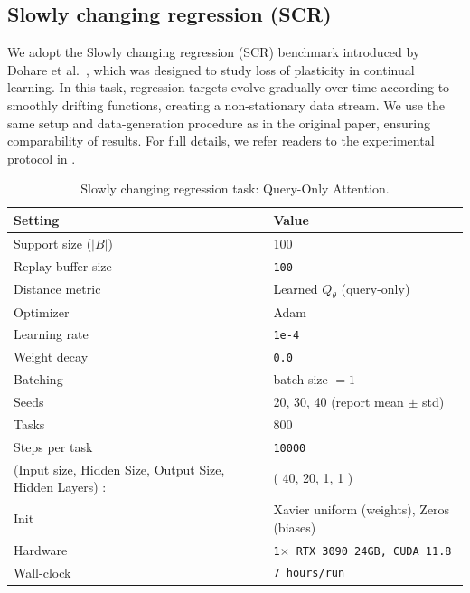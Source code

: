 \documentclass{article}
\begin{document}
\clearpage

\subsection{Slowly changing regression (SCR)}
\label{sec:scr_setup}
We adopt the Slowly changing regression (SCR) benchmark introduced by Dohare et al.~\citep{dohare2024loss}, 
which was designed to study loss of plasticity in continual learning.  
In this task, regression targets evolve gradually over time according to smoothly drifting functions, 
creating a non-stationary data stream.  
We use the same setup and data-generation procedure as in the original paper, ensuring comparability of results.  
For full details, we refer readers to the experimental protocol in \citep{dohare2024loss}.


 
\begin{table}[H]
\centering
\footnotesize
\caption{Slowly changing regression task: Query-Only Attention.}
\label{tab:scr_query_only_attention}
\begin{tabular}{@{}ll@{}}
\toprule
Setting & Value \\ \midrule
Support size ($|B|$) & 100 \\
Replay buffer size & \texttt{100} \\
Distance metric & Learned $Q_{\theta}$ (query-only) \\
Optimizer & Adam \\
Learning rate & \texttt{1e-4} \\
Weight decay & \texttt{0.0} \\
Batching &  batch size $=1$ \\
Seeds & 20, 30, 40 (report mean $\pm$ std) \\
Tasks & 800 \\
Steps per task & \texttt{10000} \\
(Input size, Hidden Size, Output Size, Hidden Layers) : & ( 40, 20, 1, 1 ) \\ 
Init & Xavier uniform (weights), Zeros (biases)\\
Hardware & \texttt{1$\times$ RTX 3090 24GB, CUDA 11.8} \\
Wall-clock & \texttt{7 hours/run} \\
\bottomrule
\end{tabular}
\end{table}
\end{document}
